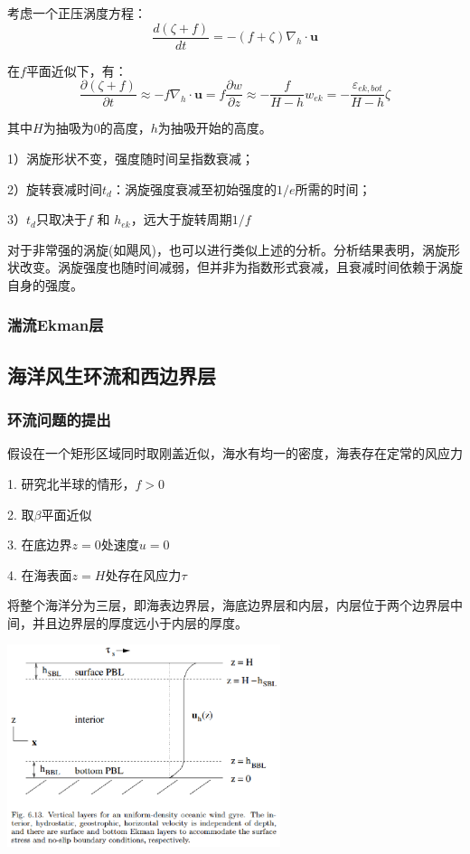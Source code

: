 \documentclass{article}
\begin{document}
考虑一个正压涡度方程：
$$\frac{d(\zeta +f)}{dt}=-(f+\zeta ){{\nabla }_{h}}\cdot\mathbf{u}$$

在$f$平面近似下，有：
$$\frac{\partial(\zeta +f)}{\partial t}\approx-f{{\nabla }_{h}}\cdot\mathbf{u}=f\frac{\partial w}{\partial z}\approx-\frac{f}{H-h}w_{ek}=-\frac{{\varepsilon }_{ek,bot}}{H-h}\zeta$$

其中$H$为抽吸为$0$的高度，$h$为抽吸开始的高度。

1）涡旋形状不变，强度随时间呈指数衰减；

2）旋转衰减时间$t_d$：涡旋强度衰减至初始强度的$1/e$所需的时间；

3）$t_d$只取决于$f$ 和 $h_{ek}$，远大于旋转周期$1/f$

对于非常强的涡旋(如飓风)，也可以进行类似上述的分析。分析结果表明，涡旋形状改变。涡旋强度也随时间减弱，但并非为指数形式衰减，且衰减时间依赖于涡旋自身的强度。

\subsubsection{湍流Ekman层}

\subsection{海洋风生环流和西边界层}
\subsubsection{环流问题的提出}
假设在一个矩形区域同时取刚盖近似，海水有均一的密度，海表存在定常的风应力

1. 研究北半球的情形，$f>0$

2. 取$\beta$平面近似

3. 在底边界$z=0$处速度$u=0$

4. 在海表面$z=H$处存在风应力$\tau$

将整个海洋分为三层，即海表边界层，海底边界层和内层，内层位于两个边界层中间，并且边界层的厚度远小于内层的厚度。
\begin{center}
    \includegraphics[width=8cm]{Fig5_1.png}
\end{center}
\end{document}
